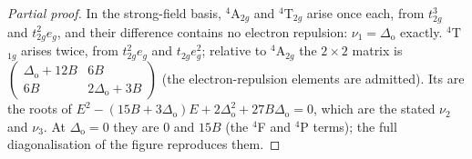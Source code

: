 \begin{proof}[Partial proof]
In the strong-field basis, $^4$A$_{2g}$ and $^4$T$_{2g}$ arise once each, from $t_{2g}^3$ and $t_{2g}^2e_g$, and
their difference contains no electron repulsion: $\nu_1 = \Delta_{\mathrm o}$ exactly. $^4$T$_{1g}$ arises
twice, from $t_{2g}^2e_g$ and $t_{2g}e_g^2$; relative to $^4$A$_{2g}$ the $2\times2$ matrix is
$\begin{pmatrix}\Delta_{\mathrm o} + 12B & 6B\\ 6B & 2\Delta_{\mathrm o} + 3B\end{pmatrix}$ (the electron-repulsion elements are admitted).
Its  are the roots of $E^2 - (15B + 3\Delta_{\mathrm o})E + 2\Delta_{\mathrm o}^2 + 27B\Delta_{\mathrm o} = 0$, which are the stated
$\nu_2$ and $\nu_3$. At $\Delta_{\mathrm o} = 0$ they are 0 and $15B$ (the $^4$F and $^4$P terms); the full
diagonalisation of the figure reproduces them.
\end{proof}

